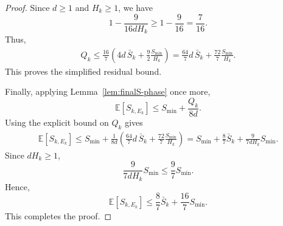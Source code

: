 \documentclass[10pt,a4paper]{amsart}
\begin{document}
\begin{proof}
Since $d\ge1$ and $H_k\ge1$, we have
\begin{equation*}
    1-\frac{9}{16dH_k}
    \ge
    1-\frac{9}{16}
    =
    \frac{7}{16}.
\end{equation*}
Thus,
\begin{equation*}
\begin{aligned}
    Q_k
    \le
    \frac{16}{7}
    \left(
        4d\,\bar S_k
        +
        \frac{9}{2}\frac{S_{\min}}{H_k}
    \right) =
    \frac{64}{7}d\,\bar S_k
    +
    \frac{72}{7}\frac{S_{\min}}{H_k}.
\end{aligned}
\end{equation*}
This proves the simplified residual bound.

Finally, applying Lemma~\ref{lem:finalS-phase} once more,
\begin{equation*}
    \mathbb E[S_{k,E_k}]
    \le
    S_{\min}
    +
    \frac{Q_k}{8d}.
\end{equation*}
Using the explicit bound on $Q_k$ gives
\begin{equation*}
\begin{aligned}
    \mathbb E[S_{k,E_k}]
    \le
    S_{\min}
    +
    \frac{1}{8d}
    \left(
        \frac{64}{7}d\,\bar S_k
        +
        \frac{72}{7}\frac{S_{\min}}{H_k}
    \right) =
    S_{\min}
    +
    \frac{8}{7}\bar S_k
    +
    \frac{9}{7dH_k}S_{\min}.
\end{aligned}
\end{equation*}
Since $dH_k\ge1$,
\begin{equation*}
    \frac{9}{7dH_k}S_{\min}
    \le
    \frac97S_{\min}.
\end{equation*}
Hence,
\begin{equation*}
    \mathbb E[S_{k,E_k}]
    \le
    \frac87\bar S_k
    +
    \frac{16}{7}S_{\min}.
\end{equation*}
This completes the proof.
\end{proof}
\end{document}
